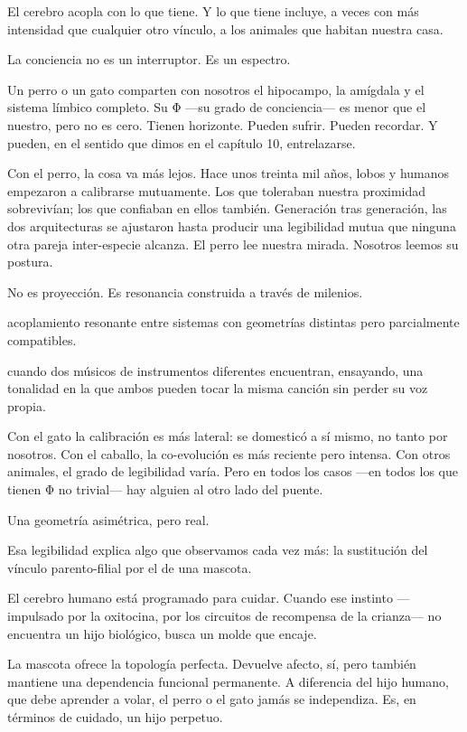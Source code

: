 El cerebro acopla con lo que tiene. Y lo que tiene incluye, a veces con más intensidad que cualquier otro vínculo, a los animales que habitan nuestra casa.

\noindent La conciencia no es un interruptor. Es un espectro.

Un perro o un gato comparten con nosotros el hipocampo, la amígdala y el sistema límbico completo. Su Φ —su grado de conciencia— es menor que el nuestro, pero no es cero. Tienen horizonte. Pueden sufrir. Pueden recordar. Y pueden, en el sentido que dimos en el capítulo 10, entrelazarse.

Con el perro, la cosa va más lejos. Hace unos treinta mil años, lobos y humanos empezaron a calibrarse mutuamente. Los que toleraban nuestra proximidad sobrevivían; los que confiaban en ellos también. Generación tras generación, las dos arquitecturas se ajustaron hasta producir una legibilidad mutua que ninguna otra pareja inter-especie alcanza. El perro lee nuestra mirada. Nosotros leemos su postura.

No es proyección. Es resonancia construida a través de milenios.

\begin{fisica}
 acoplamiento resonante entre sistemas con geometrías distintas pero parcialmente compatibles.

 cuando dos músicos de instrumentos diferentes encuentran, ensayando, una tonalidad en la que ambos pueden tocar la misma canción sin perder su voz propia.
\end{fisica}
Con el gato la calibración es más lateral: se domesticó a sí mismo, no tanto por nosotros. Con el caballo, la co-evolución es más reciente pero intensa. Con otros animales, el grado de legibilidad varía. Pero en todos los casos —en todos los que tienen Φ no trivial— hay alguien al otro lado del puente.

Una geometría asimétrica, pero real.

\noindent Esa legibilidad explica algo que observamos cada vez más: la sustitución del vínculo parento-filial por el de una mascota.

El cerebro humano está programado para cuidar. Cuando ese instinto —impulsado por la oxitocina, por los circuitos de recompensa de la crianza— no encuentra un hijo biológico, busca un molde que encaje.

La mascota ofrece la topología perfecta. Devuelve afecto, sí, pero también mantiene una dependencia funcional permanente. A diferencia del hijo humano, que debe aprender a volar, el perro o el gato jamás se independiza. Es, en términos de cuidado, un hijo perpetuo.

